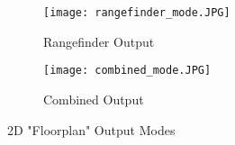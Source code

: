\begin{figure}[H] 
         \begin{subfigure}[h]{0.5\textwidth}
              \centerline{\texttt{[image: rangefinder\_mode.JPG]}}
             \caption{Rangefinder Output}
         \end{subfigure}
         \begin{subfigure}[h]{0.5\textwidth}
             \centerline{\texttt{[image: combined\_mode.JPG]}}
             \caption{Combined Output}
         \end{subfigure}
\caption{2D "Floorplan" Output Modes}
\label{rangeOutputs}
\end{figure}
